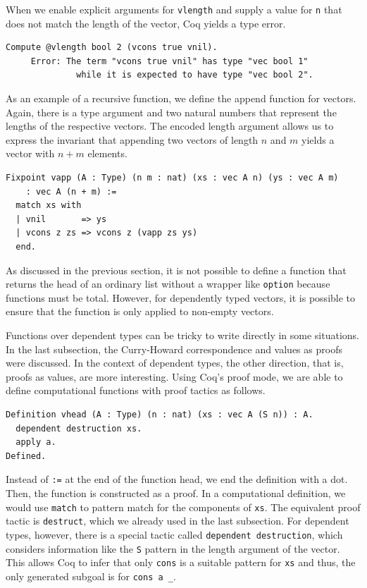 \documentclass[a4paper, 11pt, fleqn, twoside]{scrreprt}
\newcommand{\cinl}[1]{\texttt{#1}}
\begin{document}
When we enable explicit arguments for \cinl{vlength} and supply a value for \cinl{n} that does not match the length of the vector, Coq yields a type error.

\begin{verbatim}
Compute @vlength bool 2 (vcons true vnil).
     Error: The term "vcons true vnil" has type "vec bool 1"
              while it is expected to have type "vec bool 2".
\end{verbatim}

As an example of a recursive function, we define the append function for vectors.
Again, there is a type argument and two natural numbers that represent the lengths of the respective vectors.
The encoded length argument allows us to express the invariant that appending two vectors of length $n$ and $m$ yields a vector with $n + m$ elements.

\begin{verbatim}
Fixpoint vapp (A : Type) (n m : nat) (xs : vec A n) (ys : vec A m) 
    : vec A (n + m) :=
  match xs with
  | vnil       => ys
  | vcons z zs => vcons z (vapp zs ys)
  end.
\end{verbatim}

As discussed in the previous section, it is not possible to define a function that returns the head of an ordinary list without a wrapper like \cinl{option} because functions must be total.
However, for dependently typed vectors, it is possible to ensure that the function is only applied to non-empty vectors.

Functions over dependent types can be tricky to write directly in some situations.
In the last subsection, the Curry-Howard correspondence and values as proofs were discussed.
In the context of dependent types, the other direction, that is, proofs as values, are more interesting.
Using Coq's proof mode, we are able to define computational functions with proof tactics as follows.

\begin{verbatim}
Definition vhead (A : Type) (n : nat) (xs : vec A (S n)) : A.
  dependent destruction xs.
  apply a.
Defined.
\end{verbatim}

Instead of \cinl{:=} at the end of the function head, we end the definition with a dot.
Then, the function is constructed as a proof.
In a computational definition, we would use \cinl{match} to pattern match for the components of \cinl{xs}.
The equivalent proof tactic is \cinl{destruct}, which we already used in the last subsection.
For dependent types, however, there is a special tactic called \cinl{dependent destruction}, which considers information like the \cinl{S} pattern in the length argument of the vector.
This allows Coq to infer that only \cinl{cons} is a suitable pattern for \cinl{xs} and thus, the only generated subgoal is for \cinl{cons a _}.
\end{document}
